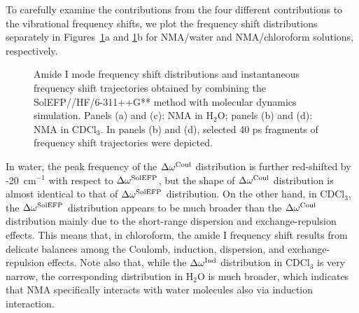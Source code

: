 \documentclass[b5paper,oneside,fleqn,11pt]{book}
\begin{document}
\begin{refsection}
To carefully examine the contributions from the four
different contributions to the vibrational frequency shifts, 
we plot the frequency shift distributions
separately in Figures~\ref{f:nma-solefp-md-distr}a and 
\ref{f:nma-solefp-md-distr}b for NMA/water and
NMA/chloroform solutions, respectively. 
%
\begin{figure}[t!]
\centering
\setlength\fboxsep{0.4pt}
\setlength\fboxrule{0.5pt}
\caption{
Amide I mode frequency shift distributions and instantaneous 
frequency shift trajectories obtained by combining 
the SolEFP//HF/6-311++G** method with molecular dynamics 
simulation. Panels (a) and (c): NMA in H$_2$O; panels (b) and (d): 
NMA in CDCl$_3$. In panels (b) and (d), selected 40 ps fragments 
of frequency shift trajectories were depicted.
\label{f:nma-solefp-md-distr}}
\end{figure}
%
In water, the peak
frequency of the $\Delta\omega^{\rm Coul}$ distribution is further red\hyp{}shifted by
-20~cm$^{-1}$ with respect to $\Delta\omega^{\rm SolEFP}$, but the shape of $\Delta\omega^{\rm Coul}$
distribution is almost identical to that of $\Delta\omega^{\rm SolEFP}$ distribution.
On the other hand, in CDCl$_3$, the $\Delta\omega^{\rm SolEFP}$ distribution appears
to be much broader than the $\Delta\omega^{\rm Coul}$ distribution mainly due
to the short\hyp{}range dispersion and exchange\hyp{}repulsion effects.
This means that, in chloroform, the amide I frequency shift
results from delicate balances among the Coulomb, induction,
dispersion, and exchange\hyp{}repulsion effects. Note also that,
while the $\Delta\omega^{\rm Ind}$ distribution in CDCl$_3$ is very narrow, the
corresponding distribution in H$_2$O is much broader, which
indicates that NMA specifically interacts with water molecules
also via induction interaction.




\end{refsection}
\end{document}
